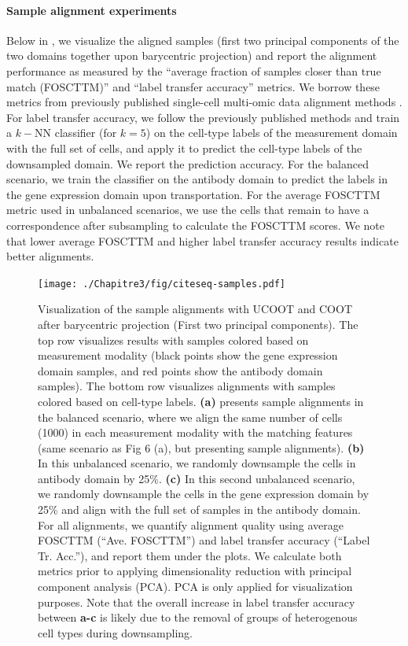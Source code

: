 \paragraph{Sample alignment experiments} Below in ,
we visualize the aligned samples (first two principal components of the two domains
together upon barycentric projection) and report the alignment performance as measured
by the ``average fraction of samples closer than true match (FOSCTTM)'' and
``label transfer accuracy'' metrics. We borrow these metrics from previously published
single-cell multi-omic data alignment methods \citep{Liu2019,cao2020unsupervised,Demetci22,Pamona,Demetci22-2}.
For label transfer accuracy, we follow the previously published methods
\citep{cao2020unsupervised, Pamona, Demetci22, Demetci22-2} and train a $k-$NN classifier
(for $k=5$) on the cell-type labels of the measurement domain with the full set of cells,
and apply it to predict the cell-type labels of the downsampled domain.
We report the prediction accuracy. For the balanced scenario, we train the classifier
on the antibody domain to predict the labels in the gene expression domain upon transportation.
For the average FOSCTTM metric used in unbalanced scenarios, we use the cells that
remain to have a correspondence after subsampling to calculate the FOSCTTM scores.
We note that lower average FOSCTTM and higher label transfer accuracy results indicate
better alignments.

\begin{figure}[h]
    \centering
    \texttt{[image: ./Chapitre3/fig/citeseq-samples.pdf]}
    \caption{Visualization of the sample alignments with UCOOT and COOT after
    barycentric projection (First two principal components). The top row visualizes results
    with samples colored based on measurement modality (black points show the
    gene expression domain samples, and red points show the antibody domain samples).
    The bottom row visualizes alignments with samples colored based on cell-type labels.
    \textbf{(a)} presents sample alignments in the balanced scenario, where we align
    the same number of cells (1000) in each measurement modality with the matching features
    (same scenario as Fig 6 (a), but presenting sample alignments).
    \textbf{(b)} In this unbalanced scenario, we randomly downsample
    the cells in antibody domain by 25\%.
    \textbf{(c)} In this second unbalanced scenario, we randomly downsample the cells
    in the gene expression domain by 25\% and align with the full set of samples
    in the antibody domain. For all alignments, we quantify alignment quality using
    average FOSCTTM (``Ave. FOSCTTM'') and label transfer accuracy (``Label Tr. Acc.''),
    and report them under the plots. We calculate both metrics prior to applying
    dimensionality reduction with principal component analysis (PCA).
    PCA is only applied for visualization purposes. Note that the overall increase in
    label transfer accuracy between \textbf{a-c} is likely due to the removal of
    groups of heterogenous cell types during downsampling.
    \label{fig:multiomicsSamples}
  }
\end{figure}